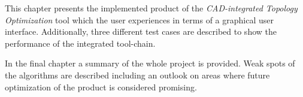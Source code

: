   \vspace{1mm}

\noindent This chapter presents the implemented product of the \emph{CAD-integrated Topology Optimization} tool which the user experiences in terms of a graphical user interface. Additionally, three different test cases are described to show the performance of the integrated tool-chain.
\\

  \vspace{1mm}

\noindent In the final chapter a summary of the whole project is provided. Weak spots of the algorithms are described including an outlook on areas where future optimization of the product is considered promising.  


\begin{comment}
\\
\noindent {\scshape Chapter 4: Summary and future work}  \vspace{1mm}

\noindent The final chapter summarizes the current status of the project and enumerates objectives for the next phase. \todourgent{Check if consistent with what the Gods want. -Saumi}
\\
\end{comment}
